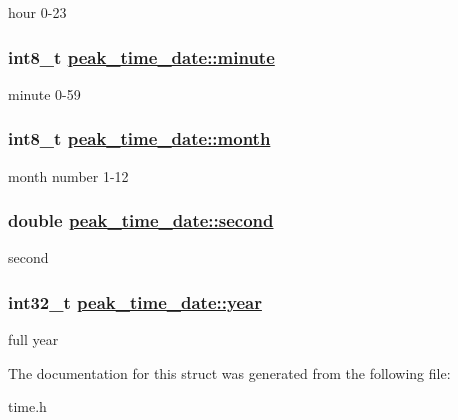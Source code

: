 hour 0-23 \hypertarget{structpeak__time__date_o4}{
\subsubsection[minute]{\setlength{\rightskip}{0pt plus 5cm}int8\_\-t \hyperlink{structpeak__time__date_o4}{peak\_\-time\_\-date::minute}}}
\label{structpeak__time__date_o4}


minute 0-59 \hypertarget{structpeak__time__date_o1}{
\subsubsection[month]{\setlength{\rightskip}{0pt plus 5cm}int8\_\-t \hyperlink{structpeak__time__date_o1}{peak\_\-time\_\-date::month}}}
\label{structpeak__time__date_o1}


month number 1-12 \hypertarget{structpeak__time__date_o5}{
\subsubsection[second]{\setlength{\rightskip}{0pt plus 5cm}double \hyperlink{structpeak__time__date_o5}{peak\_\-time\_\-date::second}}}
\label{structpeak__time__date_o5}


second \hypertarget{structpeak__time__date_o0}{
\subsubsection[year]{\setlength{\rightskip}{0pt plus 5cm}int32\_\-t \hyperlink{structpeak__time__date_o0}{peak\_\-time\_\-date::year}}}
\label{structpeak__time__date_o0}


full year 

The documentation for this struct was generated from the following file:\begin{CompactItemize}
\item 
time.h\end{CompactItemize}
